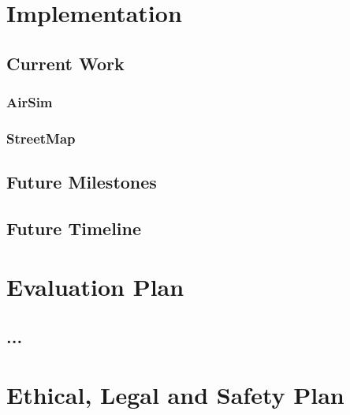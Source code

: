 \documentclass[11pt]{article}
\begin{document}
\section{Implementation}
\subsection{Current Work}
\subsubsection{AirSim}
\subsubsection{StreetMap}
\subsection{Future Milestones}
\subsection{Future Timeline}

\section{Evaluation Plan}
\subsection{...}

\section{Ethical, Legal and Safety Plan}



\newpage

\nocite{*}

\end{document}
